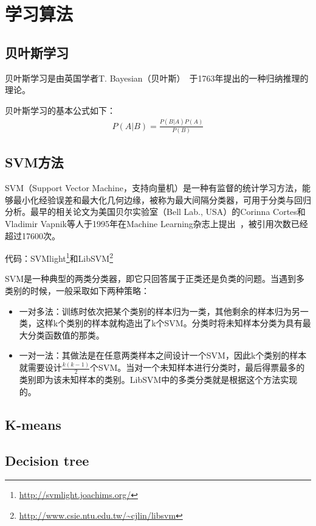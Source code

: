 \documentclass[12pt]{article}
\begin{document}
\section{学习算法}

\subsection{贝叶斯学习}

贝叶斯学习是由英国学者T. Bayesian（贝叶斯）~\cite{mr1763essay}于1763年提出的一种归纳推理的理论。

贝叶斯学习的基本公式如下：
\begin{align}
P(A|B) = \frac{P(B|A)P(A)}{P(B)}
\end{align}

\subsection{SVM方法}

SVM（Support Vector Machine，支持向量机）是一种有监督的统计学习方法，能够最小化经验误差和最大化几何边缘，被称为最大间隔分类器，可用于分类与回归分析。最早的相关论文为美国贝尔实验室（Bell Lab., USA）的Corinna Cortes和Vladimir Vapnik等人于1995年在Machine Learning杂志上提出~\cite{cortes1995support}，被引用次数已经超过17600次。

{\color{blue}代码}：SVMlight\footnote{\url{http://svmlight.joachims.org/}}和LibSVM\footnote{\url{http://www.csie.ntu.edu.tw/~cjlin/libsvm}}

SVM是一种典型的两类分类器，即它只回答属于正类还是负类的问题。当遇到多类别的时候，一般采取如下两种策略：
\begin{itemize}
    \item 一对多法：训练时依次把某个类别的样本归为一类，其他剩余的样本归为另一类，这样k个类别的样本就构造出了k个SVM。分类时将未知样本分类为具有最大分类函数值的那类。
    \item 一对一法：其做法是在任意两类样本之间设计一个SVM，因此k个类别的样本就需要设计$\frac{k(k-1)}{2}$个SVM。当对一个未知样本进行分类时，最后得票最多的类别即为该未知样本的类别。LibSVM中的多类分类就是根据这个方法实现的。
\end{itemize}

\subsection{K-means}

\subsection{Decision tree}
\end{document}
